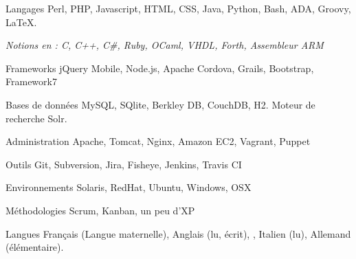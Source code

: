 
\begin{cvskills}

  \cvskill
    {Langages}
    {Perl, PHP, Javascript, HTML, CSS, Java, Python, Bash, ADA, Groovy, LaTeX.
    }

  \cvskill
    {}
    {\textit{Notions en : C, C++, C\#, Ruby, OCaml, VHDL, Forth, Assembleur ARM}}

  \cvskill
    {Frameworks}
    {jQuery Mobile, Node.js, Apache Cordova, Grails, Bootstrap, Framework7}

  \cvskill
    {Bases de données}
    {MySQL, SQlite, Berkley DB, CouchDB, H2. Moteur de recherche Solr.}

  \cvskill
    {Administration}
    {Apache, Tomcat, Nginx, Amazon EC2, Vagrant, Puppet}

  \cvskill
    {Outils}
    {Git, Subversion, Jira, Fisheye, Jenkins, Travis CI}

  \cvskill
    {Environnements}
    {Solaris, RedHat, Ubuntu, Windows, OSX}

  \cvskill
    {Méthodologies}
    {Scrum, Kanban, un peu d'XP}

  \cvskill
    {Langues}
    {Français (Langue maternelle), Anglais (lu, écrit), , Italien (lu), Allemand (élémentaire).}

\end{cvskills}
